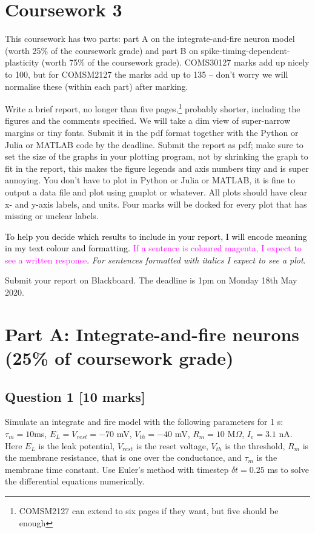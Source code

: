 \documentclass[12pt]{article}
\begin{document}
\section*{Coursework 3}
This coursework has two parts: part A on the integrate-and-fire neuron model (worth 25\% of the coursework grade) and part B on spike-timing-dependent-plasticity (worth 75\% of the coursework grade). COMS30127 marks add up nicely to 100, but for COMSM2127 the marks add up to 135 -- don't worry we will normalise these (within each part) after marking.

Write a brief report, no longer than five pages,\footnote{COMSM2127 can extend to six pages if they want, but five should be enough} probably shorter,
including the figures and the comments specified. We will take a dim view of
super-narrow margins or tiny fonts. Submit it in the pdf format
together with the Python or Julia or MATLAB code by the deadline. Submit the report as pdf; make
sure to set the size of the graphs in your plotting program, not by
shrinking the graph to fit in the report, this makes the figure
legends and axis numbers tiny and is super annoying. You don't have to
plot in Python or Julia or MATLAB, it is fine to output a data file and plot
using gnuplot or whatever. All plots should have clear x- and y-axis labels, and units. Four marks will be docked for every plot that has missing or unclear labels.

\textcolor{black}{To help you decide which results to include in your
report, I will encode meaning in my text colour and formatting. }\textcolor{magenta}{If
a sentence is coloured magenta, I expect to see a written response}.
\emph{For sentences formatted with italics I expect to see a plot}.

Submit your report on Blackboard. The deadline is 1pm on Monday 18th May 2020.

\section*{Part A: Integrate-and-fire neurons (25\% of coursework grade)}

\subsection*{Question 1 [10 marks]}

Simulate an integrate and fire model with the following parameters for
1 s: $\tau_m = 10 $ms, $E_L = V_{rest} = -70$ mV, $V_{th} = -40$ mV, $R_m= 10$
M$\Omega$, $I_e = 3.1 $ nA. Here $E_L$ is the leak potential, $V_{rest}$ is the reset voltage,
$V_{th}$ is the threshold, $R_m$ is the membrane resistance, that is one
over the conductance, and $\tau_m$ is the membrane time constant. Use Euler's method with timestep $\delta t
= 0.25$ ms to solve the differential equations numerically.
\end{document}

